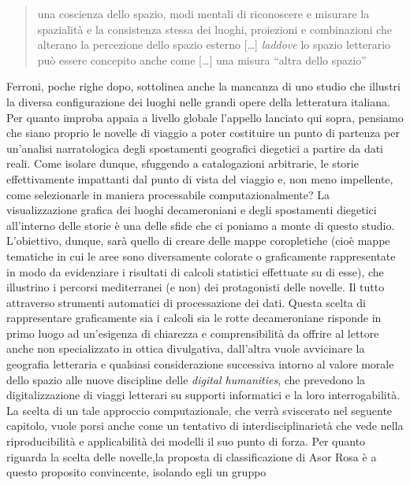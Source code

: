 \begin{quote}
una coscienza dello spazio, modi mentali di riconoscere e misurare la
spazialità e la consistenza stessa dei luoghi, proiezioni e combinazioni
che alterano la percezione dello spazio esterno {[}\ldots{}{]}
\emph{laddove} lo spazio letterario può essere concepito anche come
{[}\ldots{}{]} una misura ``altra dello spazio''

\autocite[p.~90]{ferroni2012}
\end{quote}

Ferroni, poche righe dopo, sottolinea anche la mancanza di uno studio
che illustri la diversa configurazione dei luoghi nelle grandi opere
della letteratura italiana. Per quanto improba appaia a livello globale
l'appello lanciato qui sopra, pensiamo che siano proprio le novelle di
viaggio a poter costituire un punto di partenza per un'analisi
narratologica degli spostamenti geografici diegetici a partire da dati
reali. Come isolare dunque, sfuggendo a catalogazioni arbitrarie, le
storie effettivamente impattanti dal punto di vista del viaggio e, non
meno impellente, come selezionarle in maniera processabile
computazionalmente? La visualizzazione grafica dei luoghi decameroniani
e degli spostamenti diegetici all'interno delle storie è una delle sfide
che ci poniamo a monte di questo studio. L'obiettivo, dunque, sarà
quello di creare delle mappe coropletiche (cioè mappe tematiche in cui
le aree sono diversamente colorate o graficamente rappresentate in modo
da evidenziare i risultati di calcoli statistici effettuate su di esse),
che illustrino i percorsi mediterranei (e non) dei protagonisti delle
novelle. Il tutto attraverso strumenti automatici di processazione dei
dati. Questa scelta di rappresentare graficamente sia i calcoli sia le
rotte decameroniane risponde in primo luogo ad un'esigenza di chiarezza
e comprensibilità da offrire al lettore anche non specializzato in
ottica divulgativa, dall'altra vuole avvicinare la geografia letteraria
e qualsiasi considerazione successiva intorno al valore morale dello
spazio alle nuove discipline delle \emph{digital humanities}, che
prevedono la digitalizzazione di viaggi letterari su supporti
informatici e la loro interrogabilità. La scelta di un tale approccio
computazionale, che verrà sviscerato nel seguente capitolo, vuole porsi
anche come un tentativo di interdisciplinarietà che vede nella
riproducibilità e applicabilità dei modelli il suo punto di forza. Per
quanto riguarda la scelta delle novelle,la proposta di classificazione
di Asor Rosa è a questo proposito convincente, isolando egli un gruppo

